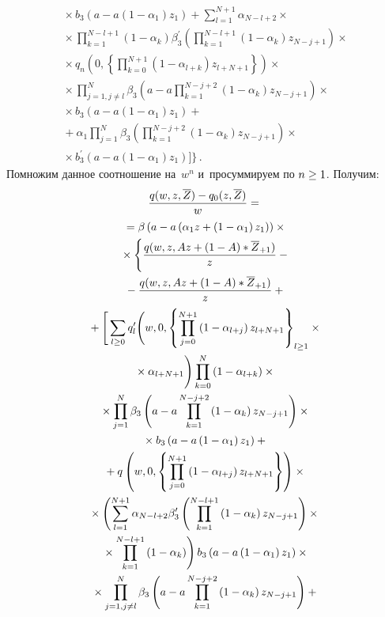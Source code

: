 \begin{multicols}{2}
  \noindent
    \begin{multline*}
    {}\times
  b_3\left(a-a\left(1-\alpha_1\right)z_1\right) +\sum\limits^{N+1}_{l=1} 
  \alpha_{N-l+2} \times{}\\
  {}\times
  \prod\limits_{k=1}^{N-l+1}\left(1-\alpha_k\right) \beta_3^\prime \left( 
\prod\limits_{k=1}^{N-l+1}\left(1-\alpha_k\right) z_{N-j+1}\right)\times{}\\
  {}\times
q_n\left(0,\left\{ \prod\limits_{k=0}^{N+1} \left(1-\alpha_{l+k}\right) 
z_{l+N+1}\right\}\right)\times{}\\
{}\times
\prod\limits^N_{j=1,j\not=l} \beta_3 \left( a-
a\prod\limits_{k=1}^{N-j+2}\left( 1-\alpha_k\right) z_{N-j+1}\right)\times{}\\
{}\times
b_3\left( a-a\left(1-\alpha_1\right)z_1\right) +{}\\
{}+\alpha_1\prod\limits^N_{j=1} \beta_3 \left( 
\prod\limits_{k=1}^{N-j+2}\left( 1-\alpha_k\right) z_{N-j+1}\right)\times{}\\
{}\times b_3^\prime
\left( a-a\left( 1-\alpha_1\right)z_1\right)\Bigg]\Bigg\}\,.
\end{multline*}
  Помножим данное соотношение на~$w^n$ и~просуммируем по $n\hm\geq1$. 
Получим:
  \begin{multline*}
  \displaystyle\frac{\displaystyle q(w,z,\overline{Z})-q_0(z,\overline{Z})\mathstrut}{\displaystyle w\mathstrut}={}\\
{}=\beta\left(
  a-a\left( \alpha_1 z+\left( 1-\alpha_1\right) z_1\right)\right)\times{}\\
  {}\times
  \Bigg\{
  \displaystyle\frac{\displaystyle q(w,z,Az+(1-A)*\overline{Z}_{+1})\mathstrut}{\displaystyle z\mathstrut}-{}\\
  {}-\displaystyle\frac{\displaystyle q(w,z,Az+(1-A)*\overline{Z}_{+1})\mathstrut}{\displaystyle z\mathstrut}+{}\\
  {}+\Bigg[
  \sum\limits_{l\geq0} q_l^\prime \Bigg( w,0,\left\{
  \prod\limits_{j=0}^{N+1} \left(1-\alpha_{l+j}\right)
   z_{l+N+1}\right\}_{l\geq1} \times{}\\
   {}\times \alpha_{l+N+1}\Bigg)
  \prod\limits^N_{k=0} \left(1-\alpha_{l+k}\right) 
  \times{}\\
  {}\times
  \prod\limits^N_{j=1} \beta_3 
\left( a-a\prod\limits_{k=1}^{N-j+2}\left(1-\alpha_k\right)
  z_{N-j+1}\right)\times{}\\
  {}\times b_3\left( a-a\left( 1-\alpha_1\right) z_1\right)+{}\\
  {}+q\left( w,0,\left\{ \prod\limits_{j=0}^{N+1} \left(1-\alpha_{l+j}\right) 
z_{l+N+1}\right\} \right)\times{}\\
{}\times
  \left( \sum\limits_{l=1}^{N+1} \alpha_{N-l+2} \beta_3^\prime \left(
  \prod\limits_{k=1}^{N-l+1}\left(1-\alpha_k\right) z_{N-
j+1}\right)\times{}\right.\\
\left.{}\times\prod\limits_{k=1}^{N-l+1}\left(1-\alpha_k\right)\right)
 b_3\left(a-a\left( 1-\alpha_1\right)z_1\right) \times{}\\
 {}\times \prod\limits^N_{j=1,j\not=l} 
\beta_3 \left(a-a\prod\limits_{k=1}^{N-j+2}\left(1-\alpha_k\right) 
z_{N-j+1}\right)+{}
\end{multline*}


\end{multicols}

